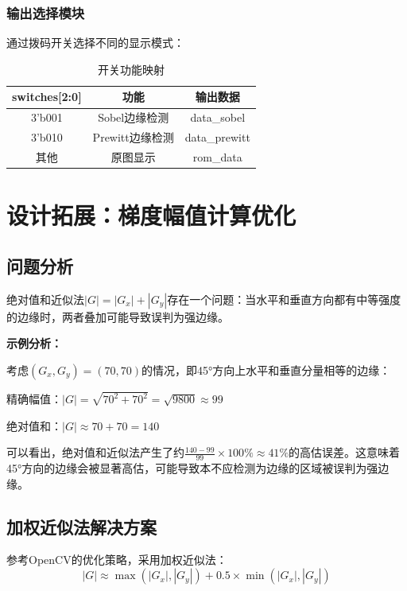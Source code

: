 \documentclass[12pt,hyperref,a4paper,UTF8]{ctexart}
\begin{document}
\subsubsection{输出选择模块}

通过拨码开关选择不同的显示模式：

\begin{table}[H]
\centering
\caption{开关功能映射}
\begin{tabular}{ccc}
\toprule
\textbf{switches[2:0]} & \textbf{功能} & \textbf{输出数据} \\
\midrule
3'b001 & Sobel边缘检测 & data\_sobel \\
3'b010 & Prewitt边缘检测 & data\_prewitt \\
其他 & 原图显示 & rom\_data \\
\bottomrule
\end{tabular}
\end{table}

\section{设计拓展：梯度幅值计算优化}

\subsection{问题分析}

绝对值和近似法$|G| = |G_x| + |G_y|$存在一个问题：当水平和垂直方向都有中等强度的边缘时，两者叠加可能导致误判为强边缘。

\textbf{示例分析：}

考虑$(G_x, G_y) = (70, 70)$的情况，即45°方向上水平和垂直分量相等的边缘：

精确幅值：$|G| = \sqrt{70^2+70^2} = \sqrt{9800} \approx 99$

绝对值和：$|G| \approx 70+70 = 140$

可以看出，绝对值和近似法产生了约$\frac{140-99}{99} \times 100\% \approx 41\%$的高估误差。这意味着45°方向的边缘会被显著高估，可能导致本不应检测为边缘的区域被误判为强边缘。

\subsection{加权近似法解决方案}

参考OpenCV的优化策略，采用加权近似法：
\begin{equation}
|G| \approx \max(|G_x|,|G_y|) + 0.5 \times \min(|G_x|,|G_y|)
\end{equation}
\end{document}
